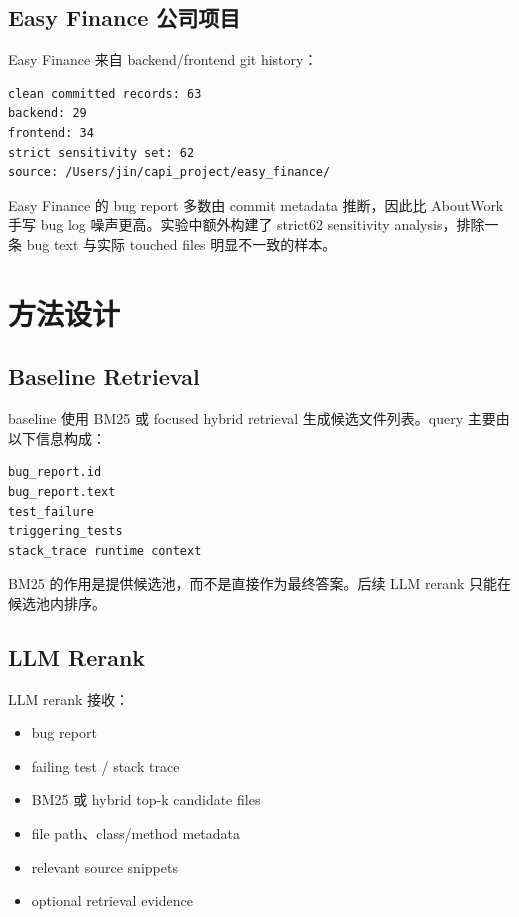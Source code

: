 \documentclass[12pt,a4paper]{ctexart}
\begin{document}
\subsection{Easy Finance 公司项目}

Easy Finance 来自 backend/frontend git history：

\begin{lstlisting}
clean committed records: 63
backend: 29
frontend: 34
strict sensitivity set: 62
source: /Users/jin/capi_project/easy_finance/
\end{lstlisting}

Easy Finance 的 bug report 多数由 commit metadata 推断，因此比 AboutWork 手写 bug log 噪声更高。实验中额外构建了 strict62 sensitivity analysis，排除一条 bug text 与实际 touched files 明显不一致的样本。

\section{方法设计}

\subsection{Baseline Retrieval}

baseline 使用 BM25 或 focused hybrid retrieval 生成候选文件列表。query 主要由以下信息构成：

\begin{lstlisting}
bug_report.id
bug_report.text
test_failure
triggering_tests
stack_trace runtime context
\end{lstlisting}

BM25 的作用是提供候选池，而不是直接作为最终答案。后续 LLM rerank 只能在候选池内排序。

\subsection{LLM Rerank}

LLM rerank 接收：

\begin{itemize}
  \item bug report
  \item failing test / stack trace
  \item BM25 或 hybrid top-k candidate files
  \item file path、class/method metadata
  \item relevant source snippets
  \item optional retrieval evidence
\end{itemize}
\end{document}
